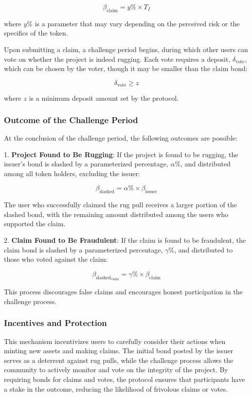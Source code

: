 \documentclass{article}
\begin{document}
\[
\beta_{\text{claim}} = y\% \times T_I
\]

where \(y\%\) is a parameter that may vary depending on the perceived risk or the specifics of the token.

Upon submitting a claim, a challenge period begins, during which other users can vote on whether the project is indeed rugging. Each vote requires a deposit, \(\delta_{\text{vote}}\), which can be chosen by the voter, though it may be smaller than the claim bond:

\[
\delta_{\text{vote}} \geq z
\]

where \(z\) is a minimum deposit amount set by the protocol.

\subsubsection{Outcome of the Challenge Period}

At the conclusion of the challenge period, the following outcomes are possible:

1. \textbf{Project Found to Be Rugging}: If the project is found to be rugging, the issuer's bond is slashed by a parameterized percentage, \(\alpha\%\), and distributed among all token holders, excluding the issuer:

\[
\beta_{\text{slashed}} = \alpha\% \times \beta_{\text{issuer}}
\]

The user who successfully claimed the rug pull receives a larger portion of the slashed bond, with the remaining amount distributed among the users who supported the claim.

2. \textbf{Claim Found to Be Fraudulent}: If the claim is found to be fraudulent, the claim bond is slashed by a parameterized percentage, \(\gamma\%\), and distributed to those who voted against the claim:

\[
\beta_{\text{slashed}_{\text{claim}}} = \gamma\% \times \beta_{\text{claim}}
\]

This process discourages false claims and encourages honest participation in the challenge process.

\subsubsection{Incentives and Protection}

This mechanism incentivizes users to carefully consider their actions when minting new assets and making claims. The initial bond posted by the issuer serves as a deterrent against rug pulls, while the challenge process allows the community to actively monitor and vote on the integrity of the project. By requiring bonds for claims and votes, the protocol ensures that participants have a stake in the outcome, reducing the likelihood of frivolous claims or votes.
\end{document}
